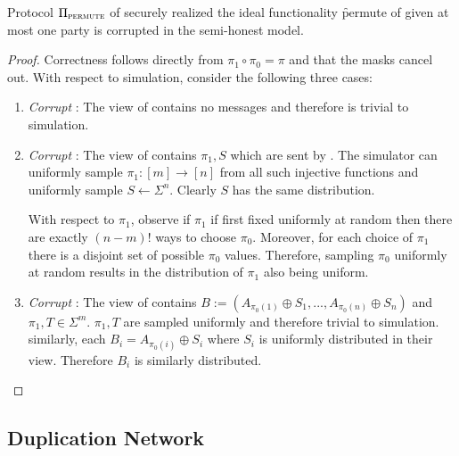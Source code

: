 \begin{theorem}\label{thm:permute}
	Protocol $\Pi_{\textsc{permute}}$ of  securely realized the ideal functionality \f{permute} of  given at most one party is corrupted in the semi-honest model.
\end{theorem}
\begin{proof}
	Correctness follows directly from $\pi_1\circ \pi_0 = \pi$ and that the masks cancel out.
	With respect to simulation, consider the following three cases:
	\begin{enumerate}
		\item \emph{Corrupt \programmer}: The view of \programmer contains no messages and therefore is trivial to simulation. 
		\item \emph{Corrupt \sender}:  The view of \programmer contains $\pi_1, S$ which are sent by \programmer. The simulator can uniformly sample $\pi_1:[m]\rightarrow[n]$ from all such injective functions and uniformly sample $S\gets\Sigma^n$. Clearly $S$ has the same distribution.
		
		With respect to $\pi_1$, observe if $\pi_1$ if first fixed uniformly at random then there are exactly $(n-m)!$ ways to choose $\pi_0$. Moreover, for each choice of $\pi_1$ there is a disjoint set of possible $\pi_0$ values. Therefore, \programmer sampling $\pi_0$ uniformly at random results in the distribution of $\pi_1$ also being uniform.
		
		\item \emph{Corrupt \receiver}: The view of \receiver contains $B:= ( A_{\pi_0(1)} \oplus S_1, ..., A_{\pi_0(n)} \oplus S_n)$  and $\pi_1, T\in \Sigma^m$. $\pi_1,T$ are sampled uniformly and therefore trivial to simulation. similarly, each $B_i=A_{\pi_0(i)}\oplus S_i$ where $S_i$ is uniformly distributed in their view. Therefore $B_i$ is similarly distributed. 
	\end{enumerate}
\end{proof}


\subsection{Duplication Network}\label{sec:dup-proof}


